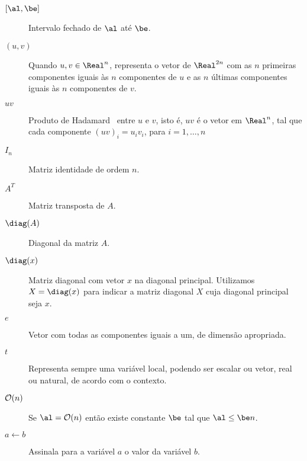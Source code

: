 \begin{description}
    \item[{$[\al, \be]$}] Intervalo fechado de $\al$ até $\be$.

    \item[$(u,v)$] Quando $u, v\in\Real^n$, representa o vetor de $\Real^{2n}$ com as $n$ primeiras componentes iguais às $n$ componentes de  $u$ e  as $n$ últimas componentes iguais às $n$ componentes de $v$.

    \item[$uv$]  Produto de Hadamard~\cite[p.~455]{Horn:1985tf} entre $u$ e $v$, 
isto é, $uv$ é o vetor em $\Real^n$, tal que cada componente  $(uv)_i  = u_iv_i$, para $i=1,\ldots,n$

\item[$I_{n}$] Matriz identidade de ordem $n$.

    \item[$A^T$] Matriz transposta de $A$.

    \item[$\diag(A)$] Diagonal da matriz $A$. 

    \item[$\diag(x)$] Matriz diagonal com vetor $x$ na diagonal principal. Utilizamos $X = \diag(x)$ para indicar a matriz diagonal $X$ cuja diagonal principal seja $x$.
 
    \item[$e$] Vetor com todas as componentes iguais a um, de dimensão apropriada.



    \item[$t$] Representa sempre uma variável local, podendo ser escalar ou vetor, real ou natural, de acordo com o contexto.


    \item[$\mathcal{O}(n)$] Se $\al = \Oset(n)$ então existe constante $\be$ tal que $\al \leq \be n$.

    \item[$a\leftarrow b$] Assinala para a variável $a$ o valor da variável $b$.

\end{description}
